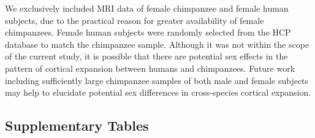 \begin{refsection}
We exclusively included MRI data of female chimpanzee and female human subjects, due to the practical reason for greater availability of female chimpanzees. Female human subjects were randomly selected from the HCP database to match the chimpanzee sample. Although it was not within the scope of the current study, it is possible that there are potential sex effects in the pattern of cortical expansion between humans and chimpanzees. Future work including sufficiently large chimpanzee samples of both male and female subjects may help to elucidate potential sex differences in cross-species cortical expansion.

\subsection*{Supplementary Tables}


\end{refsection}
